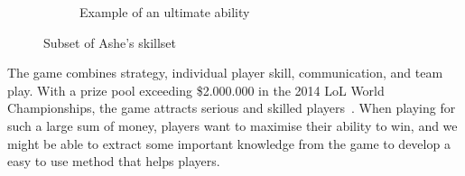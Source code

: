 \begin{figure}[!htb]
\begin{subfigure}[b]{0.49\textwidth}
          \caption{Example of an ultimate ability}
          \label{fig:enchanted}
        \end{subfigure}
        \caption{Subset of Ashe's skillset~\cite{ashe}}\label{fig:ashe}
\end{figure}

The game combines strategy, individual player skill, communication, and team play. With a prize pool exceeding \$2.000.000 in the 2014 LoL World Championships, the game attracts serious and skilled players~\cite{lolprize}. When playing for such a large sum of money, players want to maximise their ability to win, and we might be able to extract some important knowledge from the game to develop a easy to use method that helps players.


